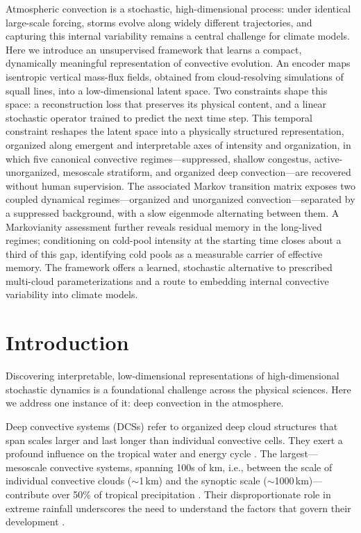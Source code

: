 \documentclass[11pt]{article}
\begin{document}
Atmospheric convection is a stochastic, high-dimensional process: under identical large-scale forcing, storms evolve along widely different trajectories, and capturing this internal variability remains a central challenge for climate models. Here we introduce an unsupervised framework that learns a compact, dynamically meaningful representation of convective evolution. An encoder maps isentropic vertical mass-flux fields, obtained from cloud-resolving simulations of squall lines, into a low-dimensional latent space. Two constraints shape this space: a reconstruction loss that preserves its physical content, and a linear stochastic operator trained to predict the next time step. This temporal constraint reshapes the latent space into a physically structured representation, organized along emergent and interpretable axes of intensity and organization, in which five canonical convective regimes---suppressed, shallow congestus, active-unorganized, mesoscale stratiform, and organized deep convection---are recovered without human supervision. The associated Markov transition matrix exposes two coupled dynamical regimes---organized and unorganized convection---separated by a suppressed background, with a slow eigenmode alternating between them. A Markovianity assessment further reveals residual memory in the long-lived regimes; conditioning on cold-pool intensity at the starting time closes about a third of this gap, identifying cold pools as a measurable carrier of effective memory. The framework offers a learned, stochastic alternative to prescribed multi-cloud parameterizations and a route to embedding internal convective variability into climate models.

\section{Introduction}

Discovering interpretable, low-dimensional representations of high-dimensional stochastic dynamics is a foundational challenge across the physical sciences. Here we address one instance of it: deep convection in the atmosphere.

Deep convective systems (DCSs) refer to organized deep cloud structures that span scales larger and last longer than individual convective cells. They exert a profound influence on the tropical water and energy cycle \citep{houze2004mesoscale, chakraborty2023overview}. The largest---mesoscale convective systems, spanning 100s of km, i.e., between the scale of individual convective clouds ($\sim$1\,km) and the synoptic scale ($\sim$1000\,km)---contribute over 50\% of tropical precipitation \citep{roca2020extreme, feng2024mesoscale}. Their disproportionate role in extreme rainfall \citep{roca2020extreme, feng2023mesoscale} underscores the need to understand the factors that govern their development \citep{prein2022towards}.
\end{document}
